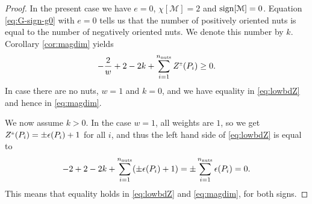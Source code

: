 \documentclass[a4paper,11pt,reqno]{amsart}
\newcommand{\nut}{P}
\newcommand{\sign}{\mathop{\rm sign}}
\newcommand{\cM}{\mathcal{M}}
\theoremstyle{plain}
\newcommand{\nnuts}{n_{\text{\rm nuts}}}
\newcommand{\PM}[1]{{{#1}^{\hspace{-.5pt}\scaleto{\pm}{3.5pt}}}}
\numberwithin{equation}{section}
\begin{document}
\begin{proof}
In the present case we have $e=0$, $\chi[\cM]=2$ and $\sign[\cM]=0$. Equation \eqref{eq:G-sign-g0} with $e=0$ tells us that the number of positively oriented nuts is equal to the number of negatively oriented nuts. We denote this number by $k$. Corollary \ref{cor:magdim} yields 
\begin{align} \label{eq:lowbdZ}
-\frac{2}{w} + 2 - 2k + \sum_{i=1}^{\nnuts}\PM{Z}(\nut_i) \geq 0.
\end{align} 
In case there are no nuts, $w=1$ and $k=0$, and we have equality in \eqref{eq:lowbdZ} and hence in 
\eqref{eq:magdim}. 

We now assume $k > 0$. 
In the case $w=1$, all weights are $1$, so we get $\PM{Z}(\nut_i)=\pm\epsilon(\nut_i)+1$ for all $i$, and thus the left hand side of \eqref{eq:lowbdZ} is equal to 
\begin{align} 
-2 +2-2k + \sum_{i=1}^{\nnuts}(\pm\epsilon(\nut_i)+1)
=
\pm\sum_{i=1}^{\nnuts}\epsilon(\nut_i) 
= 0 .
\end{align} 
This means that equality holds in \eqref{eq:lowbdZ} and \eqref{eq:magdim},  for both signs. 


\end{proof}
\end{document}
